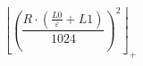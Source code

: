 \[\left\lfloor \left(\frac{R \cdot \left(\frac{L0}{\varepsilon} + L1\right)}{1024}\right)^{2} \right\rfloor_{+}\]
